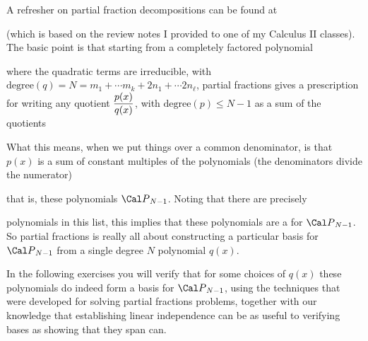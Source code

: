 \msk

A refresher on partial fraction decompositions can be found at

\ssk


\ssk

\nidt (which is based on the review notes I provided to one of my Calculus II classes). The basic 
point is that starting from a completely factored polynomial

\msk


\msk

\nidt where the quadratic terms are irreducible, with $\text{degree}(q) =N = m_1+\cdots m_k+2n_1+\cdots 2n_\ell$,
partial fractions gives a prescription for writing any quotient $\displaystyle{{p(x)}\over{q(x)}}$, with
$\text{degree}(p)\leq N-1$ as a sum of the quotients 

\ssk


\msk

What this  means, when we put things over a common denominator, is that $p(x)$ is a sum of 
constant multiples of the polynomials (the denominators divide the numerator)

\msk


\msk

\nidt that is, these polynomials  ${\Cal P}_{N-1}$. Noting that there are precisely


\nidt polynomials in this list,
this implies that these polynomials are 
a  for ${\Cal P}_{N-1}$. So partial fractions
is really all about constructing a particular basis for ${\Cal P}_{N-1}$ from a 
single degree $N$ polynomial $q(x)$.

\bsk

In the following exercises you will verify that for some choices of $q(x)$ these polynomials do 
indeed form a basis for ${\Cal P}_{N-1}$,
using the techniques that were developed for solving partial fractions problems, together with our
knowledge that establishing linear independence can be as useful to verifying bases as showing that they span can.

